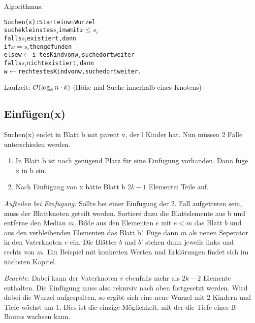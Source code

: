             Algorithmus: \\
            \begin{alltt}
                Suchen(x): Starte in w= Wurzel \\
                suche kleinstes \( s_i \) in w mit \( x \leq s_i \) \\
                falls \( s_i \) existiert, dann 
                if \( x= s_i \) then gefunden 
                else w \( \leftarrow \) i-tes Kind von w , suche dort weiter
                falls \( s_i \) nicht existiert, dann 
                w \( \leftarrow \) rechtestes Kind von w, suche dort weiter.
            \end{alltt}
            Laufzeit: $\mathcal{O}(\log_k n \cdot k)$ (Höhe mal Suche innerhalb eines Knotens)\\

        \subsection{Einfügen(x)}
            Suchen(x) endet in Blatt b mit parent v, der l Kinder hat. Nun müssen 2 Fälle unterschieden werden.
            \begin{enumerate}
                \item In Blatt b ist noch genügend Platz für eine Einfügung vorhanden. Dann füge x in b ein.
                \item Nach Einfügung von x hätte Blatt b $2k-1$ Elemente: Teile auf.
            \end{enumerate}
            
            \emph{Aufteilen bei Einfügung:} Sollte bei einer Einfügung der 2. Fall aufgetreten sein, muss der Blattknoten geteilt werden. Sortiere dazu die Blattelemente aus b und entferne den Median $m$. Bilde aus den Elementen $e$ mit $e < m$ das Blatt $b$ und aus den verbleibenden Elementen das Blatt b'. Füge dann $m$ als neuen Seperator in den Vaterknoten $v$ ein. Die Blätter $b$ und $b$' stehen dann jeweils links und rechts von $m$. Ein Beispiel mit konkreten Werten und Erklärungen findet sich im nächsten Kapitel.
            
            \emph{Beachte:} Dabei kann der Vaterknoten $v$ ebenfalls mehr als $2k-2$ Elemente enthalten. Die Einfügung muss also rekursiv nach oben fortgesetzt werden. Wird dabei die Wurzel aufgespalten, so ergibt sich eine neue Wurzel mit 2 Kindern und Tiefe wächst um 1. Dies ist die einzige Möglichkeit, mit der die Tiefe eines B-Baums wachsen kann.
            
